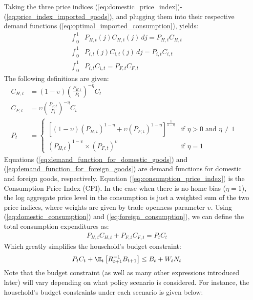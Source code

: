 Taking the three price indices (\ref{eq:domestic_price_index})-(\ref{eq:price_index_imported_goods}), and plugging them into their respective demand functions (\ref{eq:optimal_imported_consumption}), yields:
\begin{align}
    \int_{0}^{1} & P_{H,t}(j)C_{H,t}(j) \,dj = P_{H,t}C_{H,t} \label{eq:domestic_consumption}\\
    \int_{0}^{1} & P_{i,t}(j)C_{i,t}(j) \,dj = P_{i,t}C_{i,t} \\
    \int_{0}^{1} & P_{i,t}C_{i,t} = P_{F,t}C_{F,t} \label{eq:foreign_consumption}
\end{align}
The following definitions are given:
\begin{align}
    C_{H,t} & = (1-\upsilon) {\left(\frac{P_{H,t}}{P_t}\right)}^{-\eta} C_{t} \label{eq:demand_function_for_domestic_goods} & \\
    C_{F,t} & = \upsilon {\left(\frac{P_{F,t}}{P_t}\right)}^{-\eta} C_{t} \label{eq:demand_function_for_foreign_goods} & \\
    P_t &= \begin{cases}
        \left[ (1-\upsilon) (P_{H,t})^{1-\eta} + \upsilon (P_{F,t})^{1-\eta} \right]^{\frac{1}{1-\eta}} \label{eq:consumption_price_index} & \text{if $\eta > 0$ and $\eta \ne 1$}\\
        (P_{H,t})^{1-\upsilon} \times (P_{F,t})^{\upsilon} & \text{if $\eta = 1$}
    \end{cases}
\end{align}
Equations (\ref{eq:demand_function_for_domestic_goods}) and (\ref{eq:demand_function_for_foreign_goods}) are demand functions for domestic and foreign goods, respectively. Equation (\ref{eq:consumption_price_index}) is the Consumption Price Index (CPI). In the case when there is no home bias ($\eta = 1$), the log aggregate price level in the consumption is just a weighted sum of the two price indices, where weights are given by trade openness parameter $\upsilon$. Using (\ref{eq:domestic_consumption}) and (\ref{eq:foreign_consumption}), we can define the total consumption expenditures as:
\begin{align}
    P_{H,t}C_{H,t} + P_{F,t}C_{F,t} = P_t C_t
\end{align}
Which greatly simplifies the household's budget constraint:
\begin{equation}
    P_t C_t + \E_t \left[ R^{-1}_{t+1} B_{t+1} \right] \leq B_t + W_t N_t
\end{equation}
Note that the budget constraint (as well as many other expressions introduced later) will vary depending on what policy scenario is considered. For instance, the household's budget constraints under each scenario is given below:
